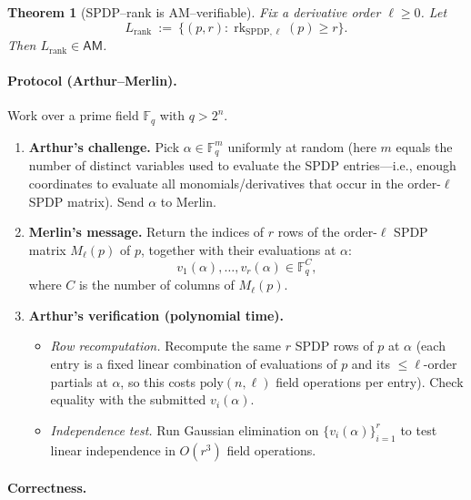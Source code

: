 \documentclass[12pt]{article}
\newtheorem{theorem}{Theorem}
\theoremstyle{definition}
\theoremstyle{definition}
\theoremstyle{remark}
\theoremstyle{remark}
\begin{document}
\begin{theorem}[SPDP--rank is AM--verifiable]\label{thm:spdp-am}
Fix a derivative order $\ell\ge 0$. Let
\[
L_{\mathrm{rank}}\ :=\ \{(p,r):\operatorname{rk}_{\mathrm{SPDP},\ell}(p)\ge r\}.
\]
Then $L_{\mathrm{rank}}\in\mathsf{AM}$.
\end{theorem}

\paragraph{Protocol (Arthur--Merlin).}
Work over a prime field $\mathbb{F}_q$ with $q>2^n$.

\begin{enumerate}
\item \textbf{Arthur's challenge.} Pick $\alpha\in\mathbb{F}_q^m$ uniformly at random (here $m$ equals the number of distinct variables used to evaluate the SPDP entries---i.e., enough coordinates to evaluate all monomials/derivatives that occur in the order-$\ell$ SPDP matrix). Send $\alpha$ to Merlin.

\item \textbf{Merlin's message.} Return the indices of $r$ rows of the order-$\ell$ SPDP matrix $M_\ell(p)$ of $p$, together with their evaluations at $\alpha$:
\[
v_1(\alpha),\ldots,v_r(\alpha)\in\mathbb{F}_q^C,
\]
where $C$ is the number of columns of $M_\ell(p)$.

\item \textbf{Arthur's verification (polynomial time).}
\begin{itemize}
\item \emph{Row recomputation.} Recompute the same $r$ SPDP rows of $p$ at $\alpha$ (each entry is a fixed linear combination of evaluations of $p$ and its $\le\ell$-order partials at $\alpha$, so this costs $\mathrm{poly}(n,\ell)$ field operations per entry). Check equality with the submitted $v_i(\alpha)$.
\item \emph{Independence test.} Run Gaussian elimination on $\{v_i(\alpha)\}_{i=1}^r$ to test linear independence in $O(r^3)$ field operations.
\end{itemize}
\end{enumerate}

\paragraph{Correctness.}
\end{document}
